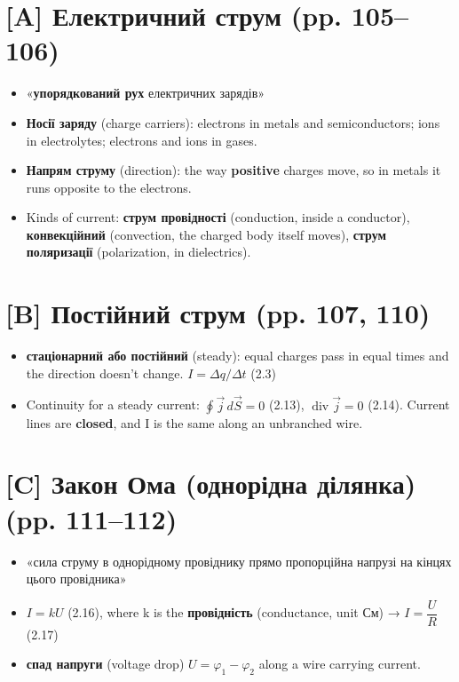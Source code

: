 \documentclass[11pt,a4paper,oneside]{book}
\begin{document}
\section*{[A] Електричний струм (pp. 105–106)}
\begin{itemize}
\item «\textbf{упорядкований рух} електричних зарядів»
\item \textbf{Носії заряду} (charge carriers): electrons in metals and semiconductors; ions in electrolytes; electrons and ions in gases.
\item \textbf{Напрям струму} (direction): the way \textbf{positive} charges move, so in metals it runs opposite to the electrons.
\item Kinds of current: \textbf{струм провідності} (conduction, inside a conductor), \textbf{конвекційний} (convection, the charged body itself moves), \textbf{струм поляризації} (polarization, in dielectrics).
\end{itemize}

\section*{[B] Постійний струм (pp. 107, 110)}
\begin{itemize}
\item \textbf{стаціонарний або постійний} (steady): equal charges pass in equal times and the direction doesn't change. $I = \Delta q/\Delta t$ (2.3)
\item Continuity for a steady current: $\oint \vec j\,d\vec S = 0$ (2.13), $\operatorname{div}\vec j = 0$ (2.14). Current lines are \textbf{closed}, and I is the same along an unbranched wire.
\end{itemize}

\section*{[C] Закон Ома (однорідна ділянка) (pp. 111–112)}
\begin{itemize}
\item «сила струму в однорідному провіднику прямо пропорційна напрузі на кінцях цього провідника»
\item $I = kU$ (2.16), where k is the \textbf{провідність} (conductance, unit См) → $I = \dfrac{U}{R}$ (2.17)
\item \textbf{спад напруги} (voltage drop) $U = \varphi_1-\varphi_2$ along a wire carrying current.
\end{itemize}
\end{document}

